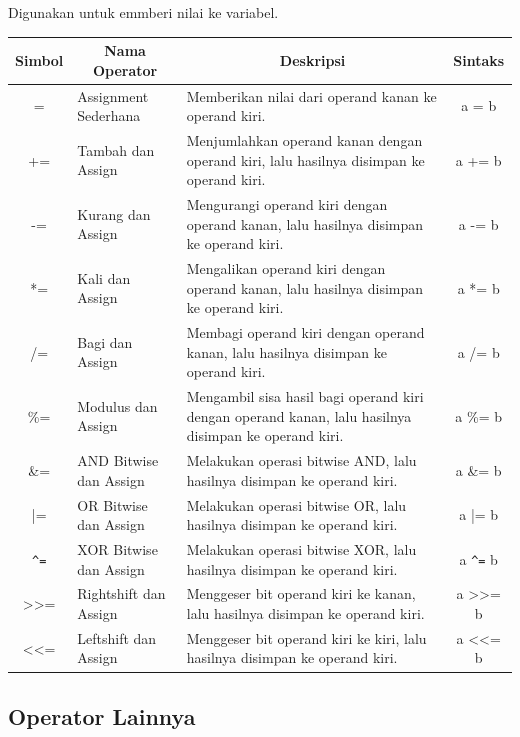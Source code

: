 Digunakan untuk emmberi nilai ke variabel.
\begin{center}
	\begin{tabular}{|c|l|p{8cm}|c|}
		\hline
		\multicolumn{1}{|c|}{\textbf{Simbol}} &
		\multicolumn{1}{c|}{\textbf{Nama Operator}} &
		\multicolumn{1}{c|}{\textbf{Deskripsi}} &
		\multicolumn{1}{c|}{\textbf{Sintaks}} \\ \hline
		=   & Assignment Sederhana & Memberikan nilai dari operand kanan ke operand kiri. & a = b \\ \hline
		+=  & Tambah dan Assign & Menjumlahkan operand kanan dengan operand kiri, lalu hasilnya disimpan ke operand kiri. & a += b \\ \hline
		-=  & Kurang dan Assign & Mengurangi operand kiri dengan operand kanan, lalu hasilnya disimpan ke operand kiri. & a -= b \\ \hline
		*=  & Kali dan Assign & Mengalikan operand kiri dengan operand kanan, lalu hasilnya disimpan ke operand kiri. & a *= b \\ \hline
		/=  & Bagi dan Assign & Membagi operand kiri dengan operand kanan, lalu hasilnya disimpan ke operand kiri. & a /= b \\ \hline
		\%=  & Modulus dan Assign & Mengambil sisa hasil bagi operand kiri dengan operand kanan, lalu hasilnya disimpan ke operand kiri. & a \%= b \\ \hline
		\&=  & AND Bitwise dan Assign & Melakukan operasi bitwise AND, lalu hasilnya disimpan ke operand kiri. & a \&= b \\ \hline
		|=  & OR Bitwise dan Assign & Melakukan operasi bitwise OR, lalu hasilnya disimpan ke operand kiri. & a |= b \\ \hline
		\verb|^=|  & XOR Bitwise dan Assign & Melakukan operasi bitwise XOR, lalu hasilnya disimpan ke operand kiri. & a \verb|^=| b \\ \hline
		>>= & Rightshift dan Assign & Menggeser bit operand kiri ke kanan, lalu hasilnya disimpan ke operand kiri. & a >>= b \\ \hline
		<<= & Leftshift dan Assign & Menggeser bit operand kiri ke kiri, lalu hasilnya disimpan ke operand kiri. & a <<= b \\ \hline
	\end{tabular}
\end{center}

\subsection{Operator Lainnya}


